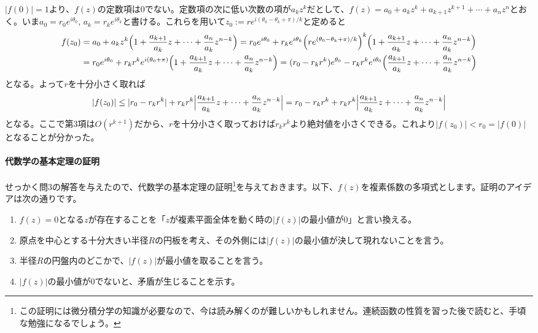 $|f(0)|=1$より、$f(z)$の定数項は$0$でない。定数項の次に低い次数の項が$a_k z^k$だとして、$f(z) = a_0 + a_k z^k + a_{k+1} z^{k+1} + \cdots + a_n z^n$とおく。いま$a_0 = r_0 e^{i\theta_0}$, $a_k = r_k e^{i\theta_k}$と書ける。これらを用いて$z_0:=re^{i(\theta_0-\theta_k+\pi)/k}$と定めると
\begin{align*}
f(z_0) &= a_0 + a_k z^k \Bigl( 1 + \frac{a_{k+1}}{a_k} z + \cdots + \frac{a_n}{a_k} z^{n-k}\Bigr)
= r_0e^{i\theta_0} + r_k e^{i\theta_k} \Bigl(re^{(\theta_0-\theta_k+\pi)/k}\Bigr)^k \Bigl( 1 + \frac{a_{k+1}}{a_k} z + \cdots + \frac{a_n}{a_k} z^{n-k}\Bigr)\\
&= r_0e^{i\theta_0} + r_k r^k e^{i(\theta_0+\pi)} \Bigl( 1 + \frac{a_{k+1}}{a_k} z + \cdots + \frac{a_n}{a_k} z^{n-k}\Bigr)
= (r_0-r_kr^k) e^{\theta_0} - r_k r^k e^{i\theta_0} \Bigl( \frac{a_{k+1}}{a_k} z + \cdots + \frac{a_n}{a_k} z^{n-k}\Bigr)
\end{align*}
となる。よって$r$を十分小さく取れば
\begin{align*}
|f(z_0)| \leq |r_0-r_k r^k | + r_k r^k \Bigl| \frac{a_{k+1}}{a_k} z + \cdots + \frac{a_n}{a_k} z^{n-k}\Bigr|
= r_0-r_k r^k + r_k r^k \Bigl| \frac{a_{k+1}}{a_k} z + \cdots + \frac{a_n}{a_k} z^{n-k}\Bigr|
\end{align*}
となる。ここで第$3$項は$O(r^{k+1})$だから、$r$を十分小さく取っておけば$r_kr^k$より絶対値を小さくできる。これより$|f(z_0)|<r_0=|f(0)|$となることが分かった。


\paragraph{代数学の基本定理の証明}

せっかく問$3$の解答を与えたので、代数学の基本定理の証明\footnote{この証明には微分積分学の知識が必要なので、今は読み解くのが難しいかもしれません。連続函数の性質を習った後で読むと、手頃な勉強になるでしょう。}を与えておきます。以下、$f(z)$を複素係数の多項式とします。証明のアイデアは次の通りです。
\begin{enumerate}
\item $f(z)=0$となる$z$が存在することを「$z$が複素平面全体を動く時の$|f(z)|$の最小値が$0$」と言い換える。
\item 原点を中心とする十分大きい半径$R$の円板を考え、その外側には$|f(z)|$の最小値が決して現れないことを言う。
\item 半径$R$の円盤内のどこかで、$|f(z)|$が最小値を取ることを言う。
\item $|f(z)|$の最小値が$0$でないと、矛盾が生じることを示す。
\end{enumerate}


